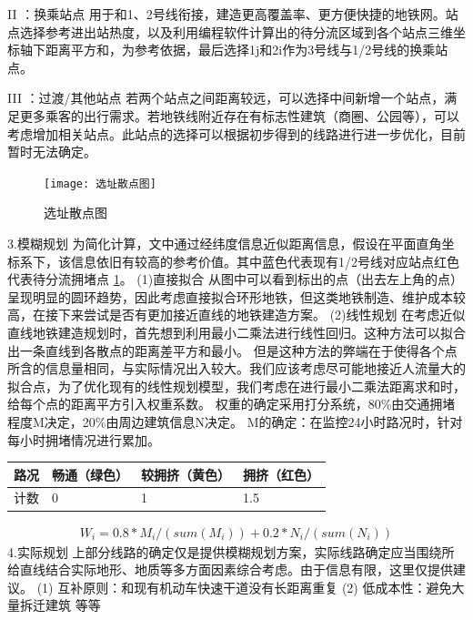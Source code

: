 \documentclass[12pt,a4paper]{mcmthesis}
\begin{document}
    II ：换乘站点
    用于和1、2号线衔接，建造更高覆盖率、更方便快捷的地铁网。站点选择参考进出站热度，以及利用编程软件计算出的待分流区域到各个站点三维坐标轴下距离平方和，为参考依据，最后选择1j和2i作为3号线与1/2号线的换乘站点。

    III ：过渡/其他站点
    若两个站点之间距离较远，可以选择中间新增一个站点，满足更多乘客的出行需求。若地铁线附近存在有标志性建筑（商圈、公园等），可以考虑增加相关站点。此站点的选择可以根据初步得到的线路进行进一步优化，目前暂时无法确定。


    \begin{figure}[h!t]
        \centerline{\texttt{[image: 选址散点图]}\quad
        }
        \caption{\song\wuhao
        选址散点图}
        \label{fig:选址散点图}
    \end{figure}

    3.模糊规划
    为简化计算，文中通过经纬度信息近似距离信息，假设在平面直角坐标系下，该信息依旧有较高的参考价值。其中蓝色代表现有1/2号线对应站点红色代表待分流拥堵点 \ref{fig:选址散点图}。
    (1)直接拟合
    从图中可以看到标出的点（出去左上角的点）呈现明显的圆环趋势，因此考虑直接拟合环形地铁，但这类地铁制造、维护成本较高，在接下来尝试是否有更加接近直线的地铁建造方案。
    (2)线性规划
    在考虑近似直线地铁建造规划时，首先想到利用最小二乘法进行线性回归。这种方法可以拟合出一条直线到各散点的距离差平方和最小。
    但是这种方法的弊端在于使得各个点所含的信息量相同，与实际情况出入较大。我们应该考虑尽可能地接近人流量大的拟合点，为了优化现有的线性规划模型，我们考虑在进行最小二乘法距离求和时，给每个点的距离平方引入权重系数。
    权重的确定采用打分系统，80\%由交通拥堵程度M决定，20\%由周边建筑信息N决定。
    M的确定：在监控24小时路况时，针对每小时拥堵情况进行累加。
    \begin{table}
        \centering
        \begin{tabular}{|l|l|l|l|}
            \hline
            路况 & 畅通（绿色） & 较拥挤（黄色） & 拥挤（红色） \\ \hline
            计数 & 0      & 1       & 1.5    \\ \hline
        \end{tabular}
    \end{table}
    \begin{equation}
        \begin{aligned}
            W_i=0.8*M_i/(sum(M_i))+0.2*N_i/(sum(N_i))
        \end{aligned}
    \end{equation}
    4.实际规划
    上部分线路的确定仅是提供模糊规划方案，实际线路确定应当围绕所给直线结合实际地形、地质等多方面因素综合考虑。由于信息有限，这里仅提供建议。
    (1)    互补原则：和现有机动车快速干道没有长距离重复
    (2)    低成本性：避免大量拆迁建筑
    等等
\end{document}
